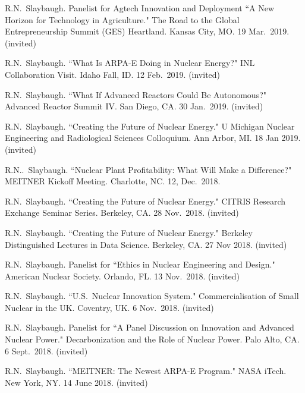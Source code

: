 \begin{bibsection}
\item R.N.\ Slaybaugh. Panelist for Agtech Innovation and Deployment ``A New Horizon for Technology in Agriculture." The Road to the Global Entrepreneurship Summit (GES) Heartland. Kansas City, MO. 19 Mar.\ 2019. (invited)

\item R.N.\ Slaybaugh. ``What Is ARPA-E Doing in Nuclear Energy?" INL Collaboration Visit. Idaho Fall, ID. 12 Feb.\ 2019. (invited)

\item R.N.\ Slaybaugh. ``What If  Advanced Reactors Could Be Autonomous?" Advanced Reactor Summit IV. San Diego, CA. 30 Jan.\ 2019. (invited)

\item R.N.\ Slaybaugh. ``Creating the Future of Nuclear Energy." U Michigan Nuclear Engineering and Radiological Sciences Colloquium. Ann Arbor, MI. 18 Jan 2019. (invited)

\item R.N..\ Slaybaugh. ``Nuclear Plant Profitability: What Will Make a Difference?" MEITNER Kickoff Meeting. Charlotte, NC. 12, Dec.\ 2018.

\item R.N.\ Slaybaugh. ``Creating the Future of Nuclear Energy." CITRIS Research Exchange Seminar Series. Berkeley, CA. 28 Nov.\ 2018. (invited)

\item R.N.\ Slaybaugh. ``Creating the Future of Nuclear Energy." Berkeley Distinguished Lectures in Data Science. Berkeley, CA. 27 Nov 2018. (invited)

\item R.N.\ Slaybaugh. Panelist for ``Ethics in Nuclear Engineering and Design." American Nuclear Society. Orlando, FL. 13 Nov.\ 2018. (invited)

\item R.N.\ Slaybaugh.  ``U.S.\ Nuclear Innovation System." Commercialisation of Small Nuclear in the UK. Coventry, UK. 6 Nov.\ 2018. (invited)

\item R.N.\ Slaybaugh. Panelist for ``A Panel Discussion on Innovation and Advanced Nuclear Power." Decarbonization and the Role of Nuclear Power. Palo Alto, CA. 6 Sept.\ 2018. (invited)

\item R.N.\ Slaybaugh.  ``MEITNER: The Newest ARPA-E Program." NASA iTech. New York, NY. 14 June 2018. (invited)


\end{bibsection}
